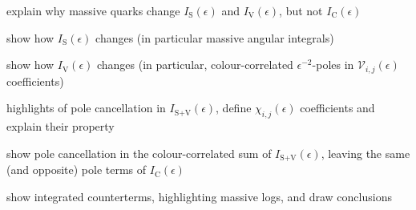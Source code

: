 
\begin{frame}

  explain why massive quarks change $ I_\text{S}(\epsilon) $ and $ I_\text{V}(\epsilon) $, but not $ I_\text{C}(\epsilon) $

\end{frame}


\begin{frame}

  show how $ I_\text{S}(\epsilon) $ changes (in particular massive angular integrals)

\end{frame}


\begin{frame}

  show how $ I_\text{V}(\epsilon) $ changes (in particular, colour-correlated $ \epsilon^{-2} $-poles in $ \mathcal{V}_{i,j}(\epsilon) $ coefficients)

\end{frame}


\begin{frame}

  highlights of pole cancellation in $ I_{\text{S}+\text{V}}(\epsilon) $, define $ \chi_{i,j}(\epsilon) $ coefficients and explain their property

\end{frame}


\begin{frame}

  show pole cancellation in the colour-correlated sum of $ I_{\text{S}+\text{V}}(\epsilon) $, leaving the same (and opposite) pole terms of $ I_\text{C}(\epsilon) $

\end{frame}


\begin{frame}

  show integrated counterterms, highlighting massive logs, and draw conclusions

\end{frame}











